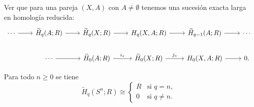 \begin{ejercicio}
Ver que para una pareja $(X, A)$ con $A \neq \emptyset$ tenemos una sucesión exacta larga en homología reducida:
\[
\begin{tikzcd}[column sep=2.2em, row sep=1.8em]
\cdots \arrow[r] & \widetilde{H}_q(A; R) \arrow[r] & \widetilde{H}_q(X; R) \arrow[r] & H_q(X, A; R) \arrow[r] & \widetilde{H}_{q-1}(A; R) \arrow[r] & \cdots \\
& \cdots \arrow[r] & \widetilde{H}_0(A; R) \arrow[r, "i_*"] & \widetilde{H}_0(X; R) \arrow[r, "j_*"] & H_0(X, A; R) \arrow[r] & 0.
\end{tikzcd}
\]
\end{ejercicio}
\begin{prop}
Para todo $n \geq 0$ se tiene
\[
\widetilde{H}_q(S^n; R) \cong
\begin{cases}
R & \text{si } q = n, \\
0 & \text{si } q \neq n.
\end{cases}
\]
\end{prop}

